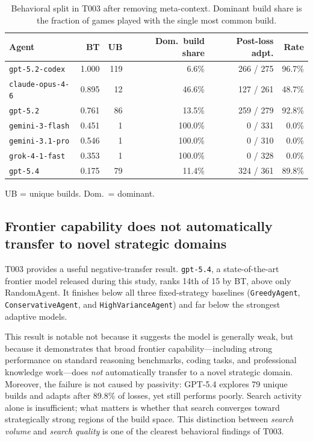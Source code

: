 \documentclass[11pt]{article}
\newcommand{\tThree}{T003}
\begin{document}
\begin{table}[t]
\centering
\footnotesize
\caption{Behavioral split in \tThree{} after removing meta-context. Dominant build share is the fraction of games played with the single most common build.}
\label{tab:t3_behavior}
\begin{tabular}{lrrrrr}
\toprule
Agent & BT & UB & Dom.\ build share & Post-loss adpt. & Rate \\
\midrule
\texttt{gpt-5.2-codex} & 1.000 & 119 & 6.6\% & 266 / 275 & 96.7\% \\
\texttt{claude-opus-4-6} & 0.895 & 12 & 46.6\% & 127 / 261 & 48.7\% \\
\texttt{gpt-5.2} & 0.761 & 86 & 13.5\% & 259 / 279 & 92.8\% \\
\midrule
\texttt{gemini-3-flash} & 0.451 & 1 & 100.0\% & 0 / 331 & 0.0\% \\
\texttt{gemini-3.1-pro} & 0.546 & 1 & 100.0\% & 0 / 310 & 0.0\% \\
\texttt{grok-4-1-fast} & 0.353 & 1 & 100.0\% & 0 / 328 & 0.0\% \\
\midrule
\texttt{gpt-5.4} & 0.175 & 79 & 11.4\% & 324 / 361 & 89.8\% \\
\bottomrule
\end{tabular}
\vspace{0.3em}
\noindent\footnotesize{UB = unique builds. Dom.\ = dominant.}
\end{table}

\subsection{Frontier capability does not automatically transfer to novel strategic domains}

\tThree{} provides a useful negative-transfer result.
\texttt{gpt-5.4}, a state-of-the-art frontier model released during this study, ranks 14th of 15 by BT, above only RandomAgent.
It finishes below all three fixed-strategy baselines (\texttt{GreedyAgent}, \texttt{ConservativeAgent}, and \texttt{HighVarianceAgent}) and far below the strongest adaptive models.

This result is notable not because it suggests the model is generally weak, but because it demonstrates that broad frontier capability---including strong performance on standard reasoning benchmarks, coding tasks, and professional knowledge work---does \emph{not} automatically transfer to a novel strategic domain.
Moreover, the failure is not caused by passivity: GPT-5.4 explores 79 unique builds and adapts after 89.8\% of losses, yet still performs poorly.
Search activity alone is insufficient; what matters is whether that search converges toward strategically strong regions of the build space.
This distinction between \emph{search volume} and \emph{search quality} is one of the clearest behavioral findings of \tThree.
\end{document}
